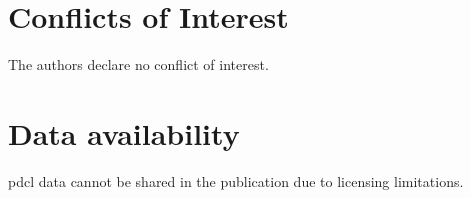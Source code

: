 \section{Conflicts of Interest}
The authors declare no conflict of interest.

\section{Data availability}
\acrshort{pdcl} data cannot be shared in the publication due to licensing limitations. 

